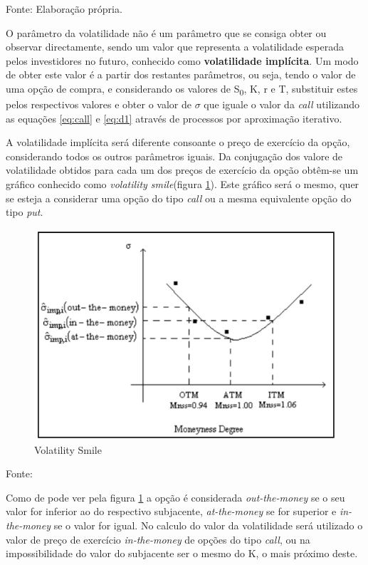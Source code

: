\documentclass[
  12pt,
  a4paper,
  openany]{book}
\begin{document}
Fonte: Elaboração própria.

\justifying
\bigskip

O parâmetro da volatilidade não é um parâmetro que se consiga obter ou observar directamente, sendo um valor que representa a volatilidade esperada pelos investidores no futuro, conhecido como \textbf{volatilidade implícita}. Um modo de obter este valor é a partir dos restantes parâmetros, ou seja, tendo o valor de uma opção de compra, e considerando os valores de S\textsubscript{0}, K, r e T, substituir estes pelos respectivos valores e obter o valor de \(\sigma\) que iguale o valor da \emph{call} utilizando as equações \eqref{eq:call} e \eqref{eq:d1} através de processos por aproximação iterativo.

A volatilidade implícita será diferente consoante o preço de exercício da opção, considerando todos os outros parâmetros iguais. Da conjugação dos valore de volatilidade obtidos para cada um dos preços de exercício da opção obtêm-se um gráfico conhecido como \emph{volatility smile}(figura \ref{fig:volatilitysmile}). Este gráfico será o mesmo, quer se esteja a considerar uma opção do tipo \emph{call} ou a mesma equivalente opção do tipo \emph{put}.

\bigskip
\begin{figure}

{\centering \includegraphics[width=0.6\linewidth]{image/volatilitysmile} 

}

\caption{Volatility Smile}\label{fig:volatilitysmile}
\end{figure}
\centering

Fonte: \citep[pp.182]{volatilitysmile}

\justifying
\bigskip

Como de pode ver pela figura \ref{fig:volatilitysmile} a opção é considerada \emph{out-the-money} se o seu valor for inferior ao do respectivo subjacente, \emph{at-the-money} se for superior e \emph{in-the-money} se o valor for igual. No calculo do valor da volatilidade será utilizado o valor de preço de exercício \emph{in-the-money} de opções do tipo \emph{call}, ou na impossibilidade do valor do subjacente ser o mesmo do K, o mais próximo deste.
\end{document}

